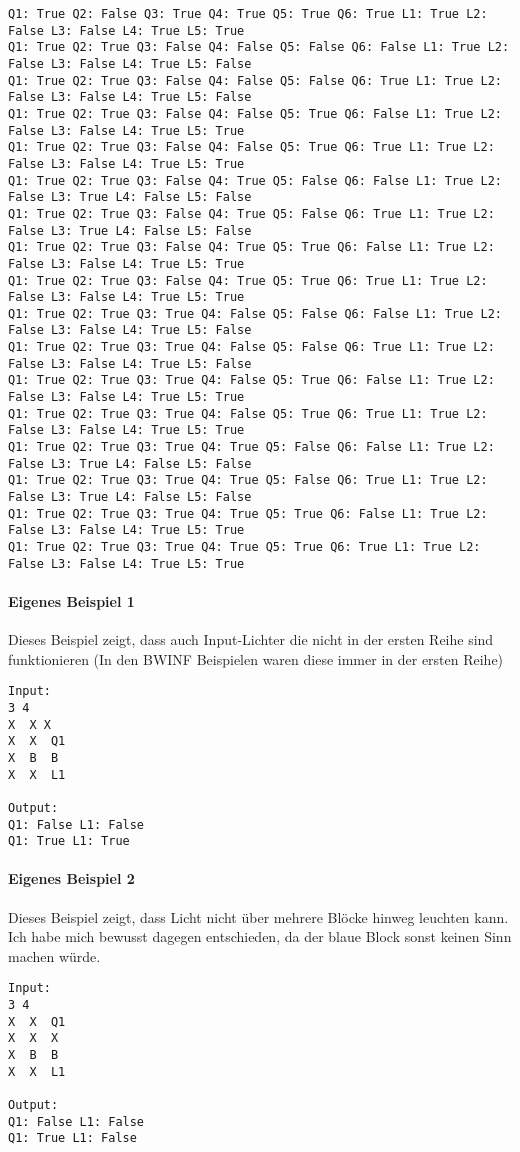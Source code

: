 \documentclass[a4paper,10pt,ngerman]{scrartcl}
\begin{document}
\begin{lstlisting}[frame=tb,breaklines=true]
Q1: True Q2: False Q3: True Q4: True Q5: True Q6: True L1: True L2: False L3: False L4: True L5: True
Q1: True Q2: True Q3: False Q4: False Q5: False Q6: False L1: True L2: False L3: False L4: True L5: False
Q1: True Q2: True Q3: False Q4: False Q5: False Q6: True L1: True L2: False L3: False L4: True L5: False
Q1: True Q2: True Q3: False Q4: False Q5: True Q6: False L1: True L2: False L3: False L4: True L5: True
Q1: True Q2: True Q3: False Q4: False Q5: True Q6: True L1: True L2: False L3: False L4: True L5: True
Q1: True Q2: True Q3: False Q4: True Q5: False Q6: False L1: True L2: False L3: True L4: False L5: False
Q1: True Q2: True Q3: False Q4: True Q5: False Q6: True L1: True L2: False L3: True L4: False L5: False
Q1: True Q2: True Q3: False Q4: True Q5: True Q6: False L1: True L2: False L3: False L4: True L5: True
Q1: True Q2: True Q3: False Q4: True Q5: True Q6: True L1: True L2: False L3: False L4: True L5: True
Q1: True Q2: True Q3: True Q4: False Q5: False Q6: False L1: True L2: False L3: False L4: True L5: False
Q1: True Q2: True Q3: True Q4: False Q5: False Q6: True L1: True L2: False L3: False L4: True L5: False
Q1: True Q2: True Q3: True Q4: False Q5: True Q6: False L1: True L2: False L3: False L4: True L5: True
Q1: True Q2: True Q3: True Q4: False Q5: True Q6: True L1: True L2: False L3: False L4: True L5: True
Q1: True Q2: True Q3: True Q4: True Q5: False Q6: False L1: True L2: False L3: True L4: False L5: False
Q1: True Q2: True Q3: True Q4: True Q5: False Q6: True L1: True L2: False L3: True L4: False L5: False
Q1: True Q2: True Q3: True Q4: True Q5: True Q6: False L1: True L2: False L3: False L4: True L5: True
Q1: True Q2: True Q3: True Q4: True Q5: True Q6: True L1: True L2: False L3: False L4: True L5: True
\end{lstlisting}

\paragraph{Eigenes Beispiel 1} Dieses Beispiel zeigt, dass auch Input-Lichter die nicht in der ersten Reihe sind funktionieren (In den BWINF Beispielen waren diese immer in der ersten Reihe)
\begin{lstlisting}[frame=tb]
Input:
3 4
X  X X  
X  X  Q1 
X  B  B  
X  X  L1 

Output:
Q1: False L1: False
Q1: True L1: True
\end{lstlisting}

\paragraph{Eigenes Beispiel 2} Dieses Beispiel zeigt, dass Licht nicht über mehrere Blöcke hinweg leuchten kann. Ich habe mich bewusst dagegen entschieden, da der blaue Block sonst keinen Sinn machen würde.
\begin{lstlisting}[frame=tb]
Input:
3 4
X  X  Q1  
X  X  X 
X  B  B  
X  X  L1 

Output:
Q1: False L1: False
Q1: True L1: False
\end{lstlisting}
\end{document}
